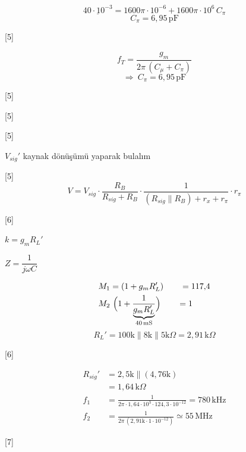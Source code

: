 \documentclass[11pt,a4paper]{article}
\begin{document}
\[ \underline{40\cdot10^{-3}} = 1600\pi\cdot10^{-6} + 1600\pi\cdot10^{6}\,C_\pi \]
\[ C_\pi = 6{,}95\,\mathrm{pF} \]

[5]

\[ f_T = \frac{g_m}{2\pi\,(C_\mu + C_\pi)} \]
\[ \Rightarrow\ C_\pi = 6{,}95\,\mathrm{pF} \]

[5]

[5]

[5]

$V_{sig}'$ kaynak dönüşümü yaparak bulalım

[5]
\[ V = V_{sig}\cdot\frac{R_B}{R_{sig}+R_B}\cdot\frac{1}{(R_{sig}\parallel R_B) + r_x + r_\pi}\cdot r_\pi \]

[6]

\textcolor{turuncukalem}{$k = g_m R_L'$}

\textcolor{turuncukalem}{$Z = \dfrac{1}{j\omega C}$}

\begin{align*}
M_1 &= (1 + g_m R_L') \qquad = 117{,}4\\
M_2 &\ \Bigl(1 + \frac{1}{\underbrace{g_m R_L'}_{40\,\mathrm{mS}}}\Bigr) \qquad = 1
\end{align*}
\[ R_L' = 100\mathrm{k} \parallel 8\mathrm{k} \parallel 5\mathrm{k}\Omega = 2{,}91\,\mathrm{k}\Omega \]

[6]

\begin{align*}
R_{sig}' &= 2{,}5\mathrm{k} \parallel (4{,}76\mathrm{k})\\
&= 1{,}64\,\mathrm{k}\Omega\\
f_1 &= \frac{1}{2\pi\cdot 1{,}64\cdot10^{3}\cdot 124{,}3\cdot10^{-12}} = 780\,\mathrm{kHz}\\
f_2 &= \frac{1}{2\pi\,(2{,}91\mathrm{k}\cdot 1\cdot10^{-12})} \simeq 55\,\mathrm{MHz}
\end{align*}

[7]
\end{document}
